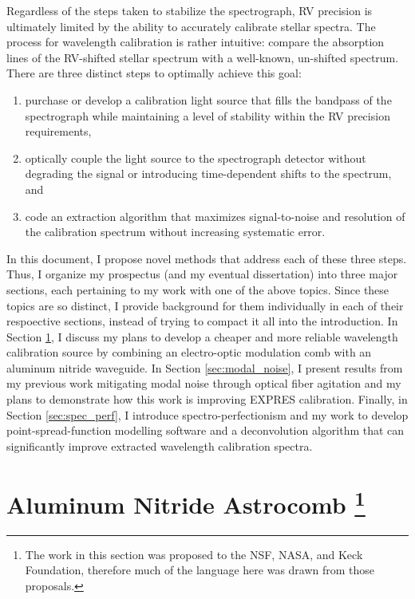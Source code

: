 \documentclass[11pt]{article}
\begin{document}
Regardless of the steps taken to stabilize the spectrograph, RV precision is ultimately limited by the ability to accurately calibrate stellar spectra. The process for wavelength calibration is rather intuitive: compare the absorption lines of the RV-shifted stellar spectrum with a well-known, un-shifted spectrum. There are three distinct steps to optimally achieve this goal:
\begin{enumerate}
    \item purchase or develop a calibration light source that fills the bandpass of the spectrograph while maintaining a level of stability within the RV precision requirements,
    \item optically couple the light source to the spectrograph detector without degrading the signal or introducing time-dependent shifts to the spectrum, and
    \item code an extraction algorithm that maximizes signal-to-noise and resolution of the calibration spectrum without increasing systematic error.
\end{enumerate}

In this document, I propose novel methods that address each of these three steps. Thus, I organize my prospectus (and my eventual dissertation) into three major sections, each pertaining to my work with one of the above topics. Since these topics are so distinct, I provide background for them individually in each of their respoective sections, instead of trying to compact it all into the introduction. In Section \ref{sec:astrocomb}, I discuss my plans to develop a cheaper and more reliable wavelength calibration source by combining an electro-optic modulation comb with an aluminum nitride waveguide. In Section \ref{sec:modal_noise}, I present results from my previous work mitigating modal noise through optical fiber agitation and my plans to demonstrate how this work is improving EXPRES calibration. Finally, in Section \ref{sec:spec_perf}, I introduce spectro-perfectionism and my work to develop point-spread-function modelling software and a deconvolution algorithm that can significantly improve extracted wavelength calibration spectra.

\section{Aluminum Nitride Astrocomb \footnote{The work in this section was proposed to the NSF, NASA, and Keck Foundation, therefore much of the language here was drawn from those proposals.}}
\label{sec:astrocomb}
\end{document}
